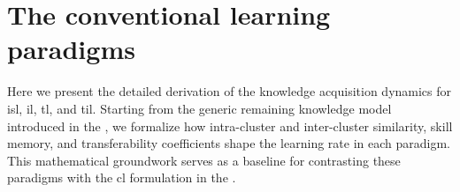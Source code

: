 \newpage
\section{The conventional learning paradigms}\label{sec:conventional_learning_paradigms}

Here we present the detailed derivation of the knowledge acquisition dynamics for \acl{isl}, \acl{il}, \acl{tl}, and \acl{til}. Starting from the generic remaining knowledge model introduced in the , we formalize how intra-cluster and inter-cluster similarity, skill memory, and transferability coefficients shape the learning rate in each paradigm. This mathematical groundwork serves as a baseline for contrasting these paradigms with the \acl{cl} formulation in the .

